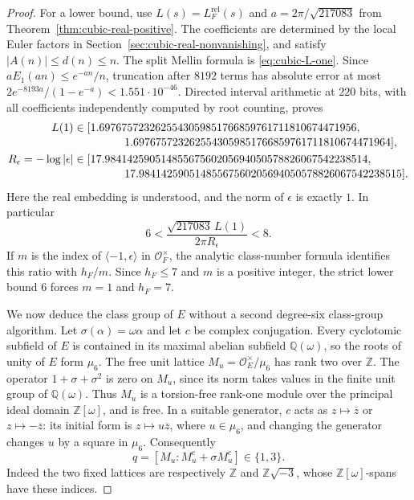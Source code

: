 \documentclass[11pt]{article}
\theoremstyle{remark}\newtheorem{remark}[theorem]{Remark}
\begin{document}
\begin{proof}
For a lower bound, use $L(s)=L_F^{\mathrm{rel}}(s)$ and $a=2\pi/\sqrt{217083}$ from Theorem~\ref{thm:cubic-real-positive}.
The coefficients are determined by the local Euler factors in Section~\ref{sec:cubic-real-nonvanishing}, and satisfy $|A(n)|\leq d(n)\leq n$.
The split Mellin formula is \eqref{eq:cubic-L-one}.
Since $aE_1(an)\leq e^{-an}/n$, truncation after $8192$ terms has absolute error at most
$2e^{-8193a}/(1-e^{-a})<1.551\cdot10^{-46}$.
Directed interval arithmetic at $220$ bits, with all coefficients independently computed by root counting, proves
\[
\begin{split}
L(1)&\in[1.6976757232625543059851766859761711810674471956,\notag\\[-2pt]
 &\hspace{16mm}1.6976757232625543059851766859761711810674471964],\\
R_\epsilon=-\log|\epsilon|&\in[17.98414259051485567560205694050578826067542238514,\notag\\[-2pt]
 &\hspace{16mm}17.98414259051485567560205694050578826067542238515].
\end{split}
\]
Here the real embedding is understood, and the norm of $\epsilon$ is exactly $1$.
In particular
\[
 6<\frac{\sqrt{217083}\,L(1)}{2\pi R_\epsilon}<8.
\]
If $m$ is the index of $\langle-1,\epsilon\rangle$ in $\mathcal O_F^\times$, the analytic class-number formula \citep[Chapter~V, Theorem~2.4]{Milne2020} identifies this ratio with $h_F/m$. Since $h_F\leq7$ and $m$ is a positive integer, the strict lower bound $6$ forces $m=1$ and $h_F=7$.

We now deduce the class group of $E$ without a second degree-six class-group algorithm.
Let $\sigma(\alpha)=\omega\alpha$ and let $c$ be complex conjugation.
Every cyclotomic subfield of $E$ is contained in its maximal abelian subfield $\mathbb Q(\omega)$, so the roots of unity of $E$ form $\mu_6$.
The free unit lattice
$M_u=\mathcal O_E^\times/\mu_6$ has rank two over $\mathbb Z$.
The operator $1+\sigma+\sigma^2$ is zero on $M_u$, since its norm takes values in the finite unit group of $\mathbb Q(\omega)$.
Thus $M_u$ is a torsion-free rank-one module over the principal ideal domain $\mathbb Z[\omega]$, and is free.
In a suitable generator, $c$ acts as $z\mapsto\overline z$ or $z\mapsto-\overline z$: its initial form is $z\mapsto u\overline z$, where $u\in\mu_6$, and changing the generator changes $u$ by a square in $\mu_6$.
Consequently
\[
 q=[M_u:M_u^c+\sigma M_u^c]\in\{1,3\}.
\]
Indeed the two fixed lattices are respectively $\mathbb Z$ and
$\mathbb Z\sqrt{-3}$, whose $\mathbb Z[\omega]$-spans have these indices.


\end{proof}
\end{document}
